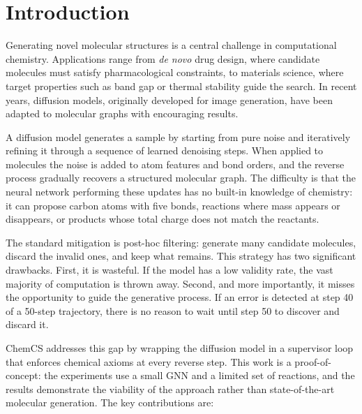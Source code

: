 \documentclass[11pt]{article}
\begin{document}
\section{Introduction}

Generating novel molecular structures is a central challenge in
computational chemistry. Applications range from \emph{de novo} drug
design, where candidate molecules must satisfy pharmacological
constraints, to materials science, where target properties such as band
gap or thermal stability guide the search. In recent years, diffusion
models, originally developed for image generation, have been adapted to
molecular graphs with encouraging results.

A diffusion model generates a sample by starting from pure noise and
iteratively refining it through a sequence of learned denoising steps.
When applied to molecules the noise is added to atom features and bond
orders, and the reverse process gradually recovers a structured molecular
graph. The difficulty is that the neural network performing these updates
has no built-in knowledge of chemistry: it can propose carbon atoms with
five bonds, reactions where mass appears or disappears, or products
whose total charge does not match the reactants.

The standard mitigation is post-hoc filtering: generate many candidate
molecules, discard the invalid ones, and keep what remains. This
strategy has two significant drawbacks. First, it is wasteful. If the
model has a low validity rate, the vast majority of computation is
thrown away. Second, and more importantly, it misses the opportunity to
guide the generative process. If an error is detected at step 40 of a
50-step trajectory, there is no reason to wait until step 50 to discover
and discard it.

ChemCS addresses this gap by wrapping the diffusion model in a
supervisor loop that enforces chemical axioms at every reverse step.
This work is a proof-of-concept: the experiments use a small GNN and a
limited set of reactions, and the results demonstrate the viability of
the approach rather than state-of-the-art molecular generation. The key
contributions are:
\end{document}

